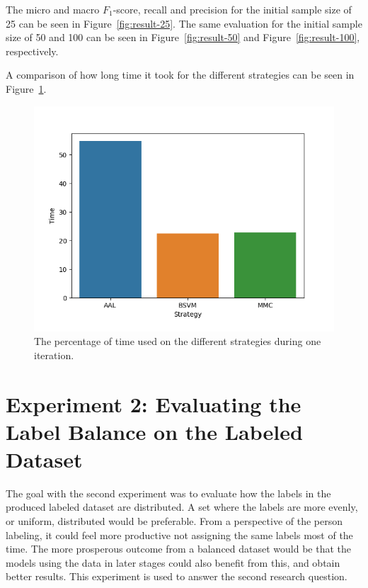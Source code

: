 The micro and macro $F_1$-score, recall and precision for the initial sample size of 25 can be seen in Figure~\ref{fig:result-25}.
The same evaluation for the initial sample size of 50 and 100 can be seen in Figure~\ref{fig:result-50} and Figure~\ref{fig:result-100}, respectively.


A comparison of how long time it took for the different strategies can be seen in Figure~\ref{fig:al-time-dist}.

\begin{figure}[!ht]
    \centering
    \includegraphics[width=\textwidth]{figures/time-distribution.png}
    \caption{The percentage of time used on the different strategies during one iteration.}
    \label{fig:al-time-dist}
\end{figure}

\section{Experiment 2: Evaluating the Label Balance on the Labeled Dataset}

The goal with the second experiment was to evaluate how the labels in the produced labeled dataset are distributed.
A set where the labels are more evenly, or uniform, distributed would be preferable.
From a perspective of the person labeling, it could feel more productive not assigning the same labels most of the time.
The more prosperous outcome from a balanced dataset would be that the models using the data in later stages could also benefit from this, and obtain better results.
This experiment is used to answer the second research question.

